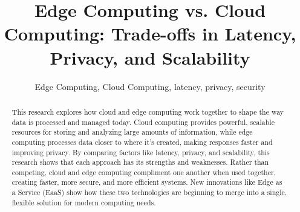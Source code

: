 \documentclass[conference]{IEEEtran}
\begin{document}
\title{Edge Computing vs. Cloud Computing: Trade-offs in Latency, Privacy, and Scalability 
}

\author{
\and

\and


\maketitle

\begin{abstract}
This research explores how cloud and edge computing work together to shape the way data is processed and managed today. Cloud computing provides powerful, scalable resources for storing and analyzing large amounts of information, while edge computing processes data closer to where it’s created, making responses faster and improving privacy. By comparing factors like latency, privacy, and scalability, this research shows that each approach has its strengths and weaknesses. Rather than competing, cloud and edge computing compliment one another when used together, creating faster, more secure, and more efficient systems. New innovations like Edge as a Service (EaaS) show how these two technologies are beginning to merge into a single, flexible solution for modern computing needs.
\end{abstract}

\begin{IEEEkeywords}
Edge Computing, Cloud Computing, latency, privacy, security
\end{IEEEkeywords}

}
\end{document}
